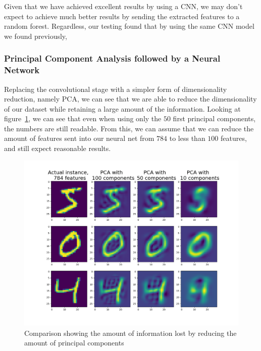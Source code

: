 \documentclass[onecolumn,10pt,cleanfoot]{asme2ej}
\begin{document}
Given that we have achieved excellent results by using a CNN, we may don't expect to achieve much better results by sending the extracted features to a random forest. Regardless, our testing found that by using the same CNN model we found previously, 

\subsubsection{Principal Component Analysis followed by a Neural Network}

Replacing the convolutional stage with a simpler form of dimensionality reduction, namely PCA, we can see that we are able to reduce the dimensionality of our dataset while retaining a large amount of the information. Looking at figure~\ref{pcacomp}, we can see that even when using only the $50$ first principal components, the numbers are still readable. From this, we can assume that we can reduce the amount of features sent into our neural net from $784$ to less than $100$ features, and still expect reasonable results.

\begin{figure}[H]
\centerline{\includegraphics[width=5in]{figure/pcacomp.png}}
\caption{Comparison showing the amount of information lost by reducing the amount of principal components}
\label{pcacomp}
\end{figure}
\end{document}
